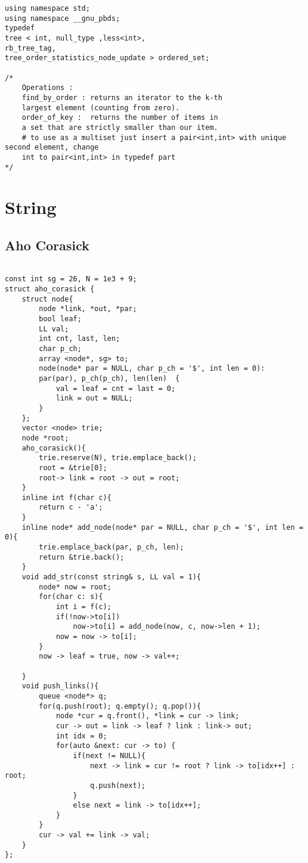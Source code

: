 \documentclass[FSZ,a4paper,onesided]{article}
\begin{document}
\begin{multicols*}{\COLS}
\begin{lstlisting}
using namespace std;
using namespace __gnu_pbds;
typedef
tree < int, null_type ,less<int>,
rb_tree_tag,
tree_order_statistics_node_update > ordered_set;

/*
    Operations :
    find_by_order : returns an iterator to the k-th
    largest element (counting from zero).
    order_of_key :  returns the number of items in
    a set that are strictly smaller than our item.
    # to use as a multiset just insert a pair<int,int> with unique second element, change
    int to pair<int,int> in typedef part
*/

\end{lstlisting}
\section{String}
\subsection{Aho Corasick}
\begin{lstlisting}

const int sg = 26, N = 1e3 + 9;
struct aho_corasick {
    struct node{
        node *link, *out, *par;
        bool leaf;
        LL val;
        int cnt, last, len;
        char p_ch;
        array <node*, sg> to;
        node(node* par = NULL, char p_ch = '$', int len = 0): 
        par(par), p_ch(p_ch), len(len)  {
            val = leaf = cnt = last = 0;
            link = out = NULL;
        }
    };
    vector <node> trie;
    node *root;
    aho_corasick(){
        trie.reserve(N), trie.emplace_back();
        root = &trie[0];
        root-> link = root -> out = root;
    }
    inline int f(char c){
        return c - 'a';
    }
    inline node* add_node(node* par = NULL, char p_ch = '$', int len = 0){
        trie.emplace_back(par, p_ch, len);
        return &trie.back();
    }
    void add_str(const string& s, LL val = 1){
        node* now = root;
        for(char c: s){
            int i = f(c);
            if(!now->to[i])
                now->to[i] = add_node(now, c, now->len + 1);
            now = now -> to[i];
        }
        now -> leaf = true, now -> val++;

    }
    void push_links(){
        queue <node*> q;
        for(q.push(root); q.empty(); q.pop()){
            node *cur = q.front(), *link = cur -> link;
            cur -> out = link -> leaf ? link : link-> out;
            int idx = 0;
            for(auto &next: cur -> to) {
                if(next != NULL){
                    next -> link = cur != root ? link -> to[idx++] : root;
                    q.push(next);
                } 
                else next = link -> to[idx++]; 
            }
        }
        cur -> val += link -> val;
    }
};
\end{lstlisting}

\end{multicols*}
\end{document}
